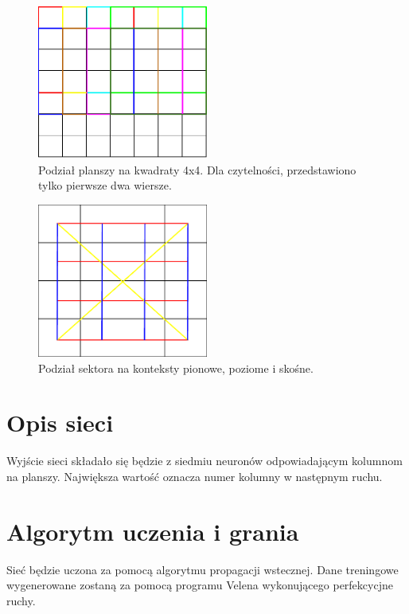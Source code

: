 \documentclass{llncs}
\begin{document}
\begin{figure}
	\centering	
	\includegraphics[width=0.5\textwidth]{img/ConnectFour4x4.pdf}
	\caption{Podział planszy na kwadraty 4x4. Dla czytelności, przedstawiono tylko pierwsze dwa wiersze.}
	\label{fig:C4Podzial}
\end{figure}

\begin{figure}
	\centering	
	\includegraphics[width=0.5\textwidth]{img/ConnectFourContexts.pdf}	\caption{Podział sektora na konteksty pionowe, poziome i skośne.}
	\label{fig:C4Konteksty}
\end{figure}

\section{Opis sieci}


Wyjście sieci składało się będzie z siedmiu neuronów odpowiadającym kolumnom na planszy. Największa wartość oznacza numer kolumny w następnym ruchu.

\section{Algorytm uczenia i grania}
Sieć będzie uczona za pomocą algorytmu propagacji wstecznej. Dane treningowe wygenerowane zostaną za pomocą programu Velena\cite{velena} wykonującego perfekcycjne ruchy.
\end{document}
